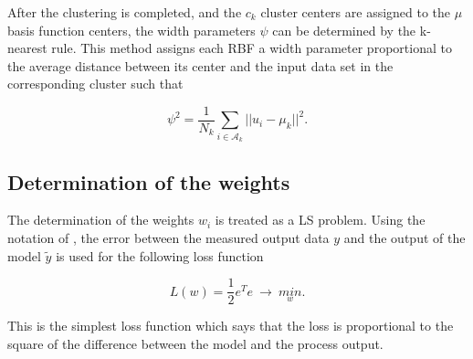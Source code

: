 After the clustering is completed, and the $c_k$ cluster centers are assigned to the $\mu$ basis function centers, the width parameters $\psi$ can be determined by the k-nearest rule. This method assigns each RBF a width parameter proportional to the average distance between its center and the input data set in the corresponding cluster such that 

 \begin{equation}
\label{cluster center}
\psi^2 = \frac{1}{N_k} \sum_{i \in \mathcal{A}_k}  ||u_i - \mu_k||^2.
\end{equation}

\subsection{Determination of the weights}
\label{determination_weights} 

The determination of the weights $w_i$ is treated as a LS problem. Using the notation of , the error between the measured output data $y$ and the output of the model $\tilde{y}$ is used for the following loss function

 \begin{equation}
\label{loss_function}
L(w) = \frac{1}{2} e^Te \ \rightarrow \ \underset{w}{min}. 
\end{equation}

This is the simplest loss function which says that the loss is proportional to the square of the difference between the model and the process output. 
